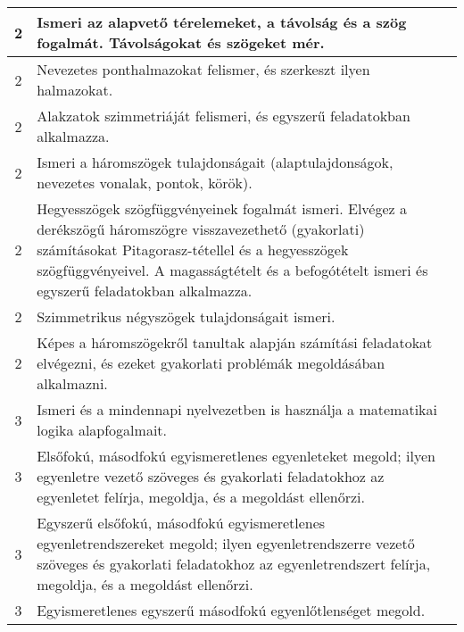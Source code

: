 \begin{longtable}{c | p{} }
                                
                                          2 &  Ismeri az alapvető térelemeket, a távolság és a szög fogalmát. Távolságokat és szögeket mér. \\ \hline
                                          2 &  Nevezetes ponthalmazokat felismer, és szerkeszt ilyen halmazokat. \\ \hline
                                          2 &  Alakzatok szimmetriáját felismeri, és egyszerű feladatokban alkalmazza. \\ \hline
                                          2 &  Ismeri a háromszögek tulajdonságait (alaptulajdonságok, nevezetes vonalak, pontok, körök). \\ \hline
                                          2 &  Hegyesszögek szögfüggvényeinek fogalmát ismeri.
Elvégez a derékszögű háromszögre visszavezethető (gyakorlati) számításokat Pitagorasz-tétellel és a hegyesszögek szögfüggvényeivel. A magasságtételt és a befogótételt ismeri és egyszerű feladatokban alkalmazza. \\ \hline
                                          2 &  Szimmetrikus négyszögek tulajdonságait ismeri. \\ \hline
                                          2 &  Képes a háromszögekről tanultak alapján számítási feladatokat elvégezni, és ezeket gyakorlati problémák megoldásában alkalmazni. \\ \hline
                                      
                                
                                          3 &  Ismeri és a mindennapi nyelvezetben is használja a matematikai logika alapfogalmait. \\ \hline
                                          3 &  Elsőfokú, másodfokú egyismeretlenes egyenleteket megold; ilyen egyenletre vezető szöveges és gyakorlati feladatokhoz az egyenletet felírja, megoldja, és a megoldást ellenőrzi. \\ \hline
                                          3 &  Egyszerű elsőfokú, másodfokú egyismeretlenes egyenletrendszereket megold; ilyen egyenletrendszerre vezető szöveges és gyakorlati feladatokhoz az egyenletrendszert felírja, megoldja, és a megoldást ellenőrzi. \\ \hline
                                          3 &  Egyismeretlenes egyszerű másodfokú egyenlőtlenséget megold. \\ \hline
                                      

\end{longtable}
